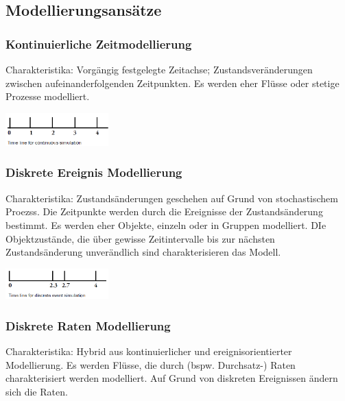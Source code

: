 \documentclass{report}
\newenvironment{Figure}
	{\par\medskip\noindent\minipage{\linewidth}}
	{\endminipage\par\medskip}
\theoremstyle{definition}
\theoremstyle{example}
\begin{document}
   \subsection{Modellierungsansätze}

      \subsubsection{Kontinuierliche Zeitmodellierung}
Charakteristika: Vorgängig festgelegte Zeitachse; Zustandsveränderungen zwischen aufeinanderfolgenden Zeitpunkten. Es werden eher Flüsse oder stetige Prozesse modelliert.
\begin{Figure}
\centering
\includegraphics[width=150px]{img/KontZeitMod.png}
	\label{fig:Abbildung einer kontinuierlichen Zeitmodellierung}
\end{Figure}

      \subsubsection{Diskrete Ereignis Modellierung}
Charakteristika: Zustandsänderungen geschehen auf Grund von stochastischem Proezss. Die Zeitpunkte werden durch die Ereignisse der Zustandsänderung bestimmt. 
Es werden eher Objekte, einzeln oder in Gruppen modelliert. DIe Objektzustände, die über gewisse Zeitintervalle bis zur nächsten Zustandsänderung unverändlich sind charakterisieren das Modell.
\begin{Figure}
\centering
\includegraphics[width=150px]{img/DiskMod.png}
	\label{fig:Abbildung einer diskreten Ereignis Modellierung}
\end{Figure}

      \subsubsection{Diskrete Raten Modellierung}
Charakteristika: Hybrid aus kontinuierlicher und ereignisorientierter Modellierung. Es werden Flüsse, die durch (bspw. Durchsatz-) Raten charakterisiert werden modelliert. Auf Grund von diskreten Ereignissen ändern sich die Raten.
\end{document}
